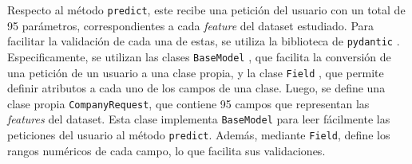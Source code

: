 Respecto al método \texttt{predict}, este recibe una petición del usuario con un total de 95 parámetros, correspondientes a cada \textit{feature} del dataset estudiado. Para facilitar la validación de cada una de estas, se utiliza la biblioteca de \texttt{pydantic} \citep{WEBSITE:pydantic}. Especificamente, se utilizan las clases \texttt{BaseModel} \citep{WEBSITE:pydantic_base_model}, que facilita la conversión de una petición de un usuario a una clase propia, y la clase \texttt{Field} \citep{WEBSITE:pydantic_field}, que permite definir atributos a cada uno de los campos de una clase. Luego, se define una clase propia \texttt{CompanyRequest}, que contiene 95 campos que representan las \textit{features} del dataset. Esta clase implementa \texttt{BaseModel} para leer fácilmente las peticiones del usuario al método \texttt{predict}. Además, mediante \texttt{Field}, define los rangos numéricos de cada campo, lo que facilita sus validaciones.